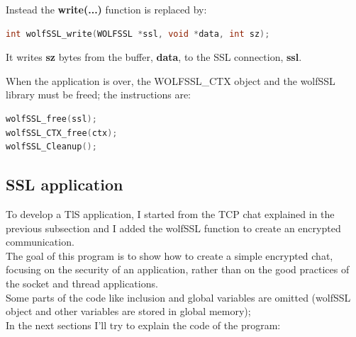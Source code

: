 \documentclass[a4paper,12pt]{article}
\begin{document}
Instead the \textbf{write(...)} function is replaced by:
\begin{lstlisting}[language=c]
int wolfSSL_write(WOLFSSL *ssl, void *data, int sz);
\end{lstlisting}
It writes \textbf{sz} bytes from the buffer, \textbf{data}, to the SSL connection, \textbf{ssl}.

When the application is over, the WOLFSSL\_CTX object and the wolfSSL library must be freed; the instructions are:
\begin{lstlisting}[language=c]
wolfSSL_free(ssl);
wolfSSL_CTX_free(ctx);
wolfSSL_Cleanup();
\end{lstlisting}


\subsection{SSL application}
To develop a TlS application, I started from the TCP chat explained in the previous subsection and I added the wolfSSL function to create an encrypted communication.
\\The goal of this program is to show how to create a simple encrypted chat, focusing on the security of an application, rather than on the good practices of the socket and thread applications.
\\Some parts of the code like inclusion and global variables are omitted (wolfSSL object and other variables are stored in global memory); 
\\In the next sections I'll try to explain the code of the program:
\end{document}
